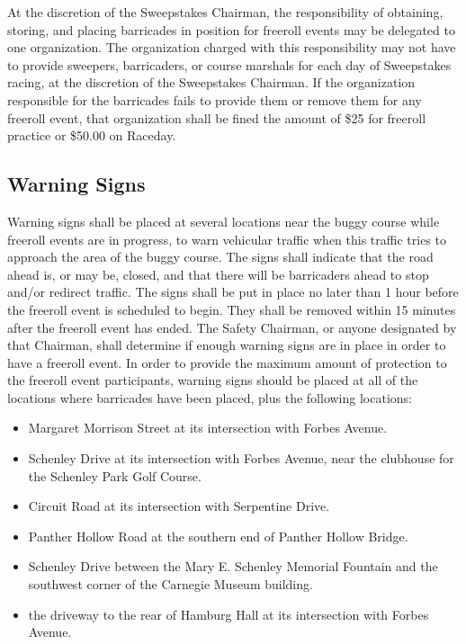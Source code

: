 	At the discretion of the Sweepstakes Chairman, the responsibility of obtaining, storing, and placing barricades in position for freeroll events may be delegated to one organization. The organization charged with this responsibility may not have to provide sweepers, barricaders, or course marshals for each day of Sweepstakes racing, at the discretion of the Sweepstakes Chairman. If the organization responsible for the barricades fails to provide them or remove them for any freeroll event, that organization shall be fined the amount of \$25 for freeroll practice or \$50.00 on Raceday.

	
\subsection{Warning Signs}
\label{subsec:WarnSigns}

	Warning signs shall be placed at several locations near the buggy course while freeroll events are in progress, to warn vehicular traffic when this traffic tries to approach the area of the buggy course. The signs shall indicate that the road ahead is, or may be, closed, and that there will be barricaders ahead to stop and/or redirect traffic. The signs shall be put in place no later than 1 hour before the freeroll event is scheduled to begin. They shall be removed within 15 minutes after the freeroll event has ended. The Safety Chairman, or anyone designated by that Chairman, shall determine if enough warning signs are in place in order to have a freeroll event. In order to provide the maximum amount of protection to the freeroll event participants, warning signs should be placed at all of the locations where barricades have been placed, plus the following locations:

	\begin{itemize}
		\item Margaret Morrison Street at its intersection with Forbes Avenue.
		\item Schenley Drive at its intersection with Forbes Avenue, near the clubhouse for the Schenley Park Golf Course.
		\item Circuit Road at its intersection with Serpentine Drive.
		\item Panther Hollow Road at the southern end of Panther Hollow Bridge.
		\item Schenley Drive between the Mary E. Schenley Memorial Fountain and the southwest corner of the Carnegie Museum building.
		\item the driveway to the rear of Hamburg Hall at its intersection with Forbes Avenue.
	\end{itemize}

